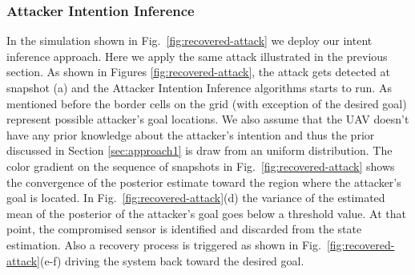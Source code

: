 \documentclass[letterpaper, 10 pt, conference]{ieeeconf}  %
\begin{document}

\subsubsection{Attacker Intention Inference}
In the simulation shown in Fig.~\ref{fig:recovered-attack} we deploy our intent inference approach. Here we apply the same attack illustrated in the previous section. 
As shown in Figures \ref{fig:recovered-attack}, the attack gets detected at snapshot (a) and the Attacker Intention Inference algorithms starts to run. 
As mentioned before the border cells on the grid (with exception of the desired goal) represent possible attacker's goal locations. We also assume that the UAV doesn't have any prior knowledge about the attacker's intention and thus the prior discussed in Section \ref{sec:approach1} is draw from an uniform distribution. The color gradient on the sequence of snapshots in Fig.~\ref{fig:recovered-attack} shows the convergence of the posterior estimate toward the region where the attacker's goal is located. In Fig.~\ref{fig:recovered-attack}(d) the variance of the estimated mean of the posterior of the attacker's goal goes below a threshold value. At that point, the compromised sensor is identified and discarded from the state estimation. Also a recovery process is triggered as shown in Fig.~\ref{fig:recovered-attack}(e-f) driving the system back toward the desired goal. 

\end{document}
